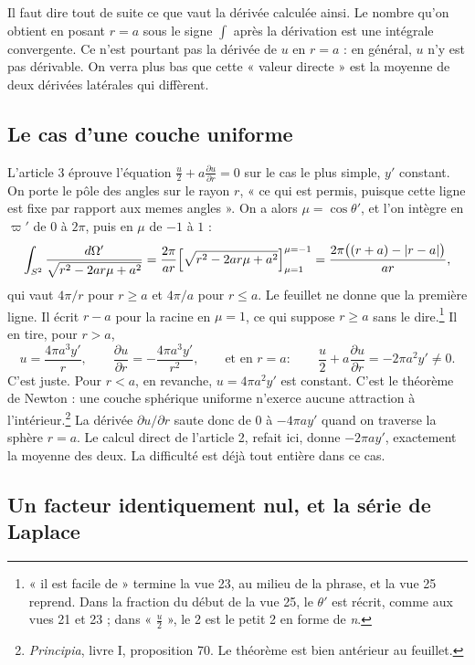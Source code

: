 \documentclass[11pt,a4paper]{article}
\begin{document}
Il faut dire tout de suite ce que vaut la dérivée calculée ainsi. Le nombre
qu'on obtient en posant \(r=a\) sous le signe \(\int\) après la dérivation est
une intégrale convergente. Ce n'est pourtant pas la dérivée de \(u\) en
\(r=a\) : en général, \(u\) n'y est pas dérivable. On verra plus bas que cette
« valeur directe » est la moyenne de deux dérivées latérales qui diffèrent.

\subsection*{Le cas d'une couche uniforme}

L'article 3 éprouve l'équation \(\frac u2+a\frac{\partial u}{\partial r}=0\)
sur le cas le plus simple, \(y'\) constant. On porte le pôle des angles sur
le rayon \(r\), « ce qui est permis, puisque cette ligne est fixe par rapport
aux memes angles ». On a alors \(\mu=\cos\theta'\), et l'on intègre en
\(\varpi'\) de \(0\) à \(2\pi\), puis en \(\mu\) de \(-1\) à \(1\) :
\[
\int_{S^2}\frac{d\Omega'}{\sqrt{r^2-2ar\mu+a^2}}
=\frac{2\pi}{ar}\Bigl[\sqrt{r^2-2ar\mu+a^2}\Bigr]_{\mu=1}^{\mu=-1}
=\frac{2\pi\bigl((r+a)-|r-a|\bigr)}{ar},
\]
qui vaut \(4\pi/r\) pour \(r\ge a\) et \(4\pi/a\) pour \(r\le a\).
Le feuillet ne donne que la première ligne. Il écrit \(r-a\) pour la racine en
\(\mu=1\), ce qui suppose \(r\ge a\) sans le dire.\footnote{« il est facile de »
termine la vue 23, au milieu de la phrase, et la vue 25 reprend. Dans la
fraction du début de la vue 25, le \(\theta'\) est récrit, comme aux vues 21
et 23 ; dans « \(\frac u2\) », le 2 est le petit 2 en forme de \emph{n}.} Il
en tire, pour \(r>a\),
\[
u=\frac{4\pi a^3y'}{r},\qquad \frac{\partial u}{\partial r}=-\frac{4\pi a^3y'}{r^2},
\qquad\text{et en }r=a:\qquad \frac u2+a\frac{\partial u}{\partial r}=-2\pi a^2y'\neq0 .
\]
C'est juste. Pour \(r<a\), en revanche, \(u=4\pi a^2y'\) est constant.
C'est le théorème de Newton : une couche sphérique uniforme n'exerce aucune
attraction à l'intérieur.\footnote{\emph{Principia}, livre I, proposition 70.
Le théorème est bien antérieur au feuillet.} La dérivée \(\partial u/\partial
r\) saute donc de \(0\) à \(-4\pi ay'\) quand on traverse la sphère \(r=a\).
Le calcul direct de l'article 2, refait ici, donne \(-2\pi ay'\), exactement la
moyenne des deux. La difficulté est déjà tout entière dans ce cas.

\subsection*{Un facteur identiquement nul, et la série de Laplace}
\end{document}
